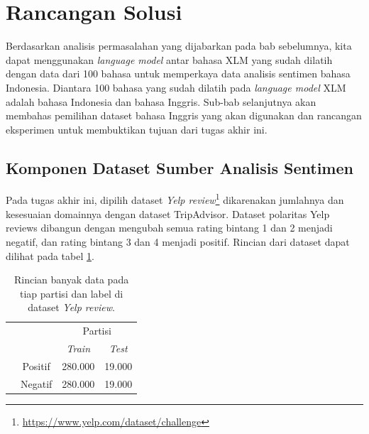 
\section{Rancangan Solusi}
	Berdasarkan analisis permasalahan yang dijabarkan pada bab sebelumnya, kita dapat menggunakan \textit{language model} antar bahasa XLM yang sudah dilatih dengan data dari 100 bahasa untuk memperkaya data analisis sentimen bahasa Indonesia. Diantara 100 bahasa yang sudah dilatih pada \textit{language model} XLM adalah bahasa Indonesia dan bahasa Inggris. Sub-bab selanjutnya akan membahas pemilihan dataset bahasa Inggris yang akan digunakan dan rancangan eksperimen untuk membuktikan tujuan dari tugas akhir ini.

	\subsection{Komponen Dataset Sumber Analisis Sentimen}
	Pada tugas akhir ini, dipilih dataset \textit{Yelp review}\footnote{\url{https://www.yelp.com/dataset/challenge}} dikarenakan jumlahnya dan kesesuaian domainnya dengan dataset TripAdvisor. Dataset polaritas Yelp reviews  dibangun dengan mengubah semua rating bintang 1 dan 2 menjadi negatif, dan rating bintang 3 dan 4 menjadi positif. Rincian dari dataset dapat dilihat pada tabel \ref{tab:detail_yelp_review}.

	\begin{table}[ht]
	    \centering
	    \caption{Rincian banyak data pada tiap partisi dan label di dataset \textit{Yelp review}.}
	    \begin{tabular}{@{}cc|cc@{}}
	    \multicolumn{1}{c}{} &\multicolumn{1}{c}{} &\multicolumn{2}{c}{Partisi} \\ 
	    \multicolumn{1}{c}{} & 
	    \multicolumn{1}{c|}{} & 
	    \multicolumn{1}{c}{\textit{Train}} & 
	    \multicolumn{1}{c}{\textit{Test}} \\ 
	    \cline{2-4}
	    \multirow[c]{2}{*}{\rotatebox[origin=tr]{90}{Label}}
	    & Positif  & 280.000 & 19.000   \\[1.5ex]
	    & Negatif  & 280.000 & 19.000   \\ 
	    \cline{2-4}
	    \end{tabular}
	    \label{tab:detail_yelp_review}
	\end{table}

